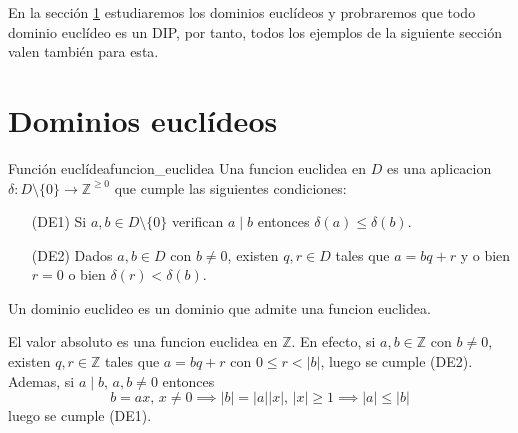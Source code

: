 En la sección \ref{dominios_euclideos} estudiaremos los dominios euclídeos y probraremos que todo dominio euclídeo es un DIP, por tanto, todos los ejemplos de la siguiente sección valen también para esta.

\clearpage
\section{Dominios euclídeos}\label{dominios_euclideos}

\begin{definition}{Función euclídea}{funcion_euclidea}
Una funcion euclidea en \(D\) es una aplicacion \(\delta: D \setminus \{0\} \to \mathbb{Z}^{\geq 0}\) que cumple las siguientes condiciones:

\begin{itemize}
\item[(DE1)] Si \(a, b \in D \setminus \{0\}\) verifican \(a \mid b\) entonces \(\delta(a) \leq \delta(b)\).

\item[(DE2)] Dados \(a, b \in D\) con \(b \neq 0\), existen \(q, r \in D\) tales que \(a = bq + r\) y o bien \(r = 0\) o bien \(\delta(r) < \delta(b)\).
\end{itemize}

Un dominio euclideo es un dominio que admite una funcion euclidea.
\end{definition}

\begin{example}{}{}
El valor absoluto es una funcion euclidea en \(\mathbb{Z}\). En efecto, si \(a, b \in \mathbb{Z}\) con \(b \neq 0\), existen \(q, r \in \mathbb{Z}\) tales que \(a = bq + r\) con \(0 \leq r < |b|\), luego se cumple (DE2). Ademas, si \(a \mid b\), \(a,b \neq 0\) entonces
\[
b = ax,\, x \neq 0 \implies |b| = |a||x|,\, |x| \geq 1 \implies |a| \leq |b|
\]
luego se cumple (DE1).
\end{example}

